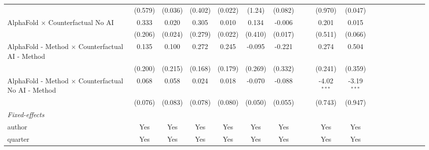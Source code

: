 \begin{tabular}{lcccccccccccccccccc}
                                                              & (0.579) & (0.036) & (0.402) & (0.022) & (1.24)        & (0.082)       &       &       & (0.970)       & (0.047)       &       &       &      &      &      &      &      &   \\   
   AlphaFold $\times$ Counterfactual No AI                    & 0.333   & 0.020   & 0.305   & 0.010   & 0.134         & -0.006        &       &       & 0.201         & 0.015         &       &       &      &      &      &      &      &   \\   
                                                              & (0.206) & (0.024) & (0.279) & (0.022) & (0.410)       & (0.017)       &       &       & (0.511)       & (0.066)       &       &       &      &      &      &      &      &   \\   
   AlphaFold - Method $\times$ Counterfactual AI - Method     & 0.135   & 0.100   & 0.272   & 0.245   & -0.095        & -0.221        &       &       & 0.274         & 0.504         &       &       &      &      &      &      &      &   \\   
                                                              & (0.200) & (0.215) & (0.168) & (0.179) & (0.269)       & (0.332)       &       &       & (0.241)       & (0.359)       &       &       &      &      &      &      &      &   \\   
   AlphaFold - Method $\times$ Counterfactual No AI - Method  & 0.068   & 0.058   & 0.024   & 0.018   & -0.070        & -0.088        &       &       & -4.02$^{***}$ & -3.19$^{***}$ &       &       &      &      &      &      &      &   \\   
                                                              & (0.076) & (0.083) & (0.078) & (0.080) & (0.050)       & (0.055)       &       &       & (0.743)       & (0.947)       &       &       &      &      &      &      &      &   \\   
   \midrule
   \emph{Fixed-effects}\\
   author                                                     & Yes     & Yes     & Yes     & Yes     & Yes           & Yes           &       &       & Yes           & Yes           &       &       &      &      &      &      &      & \\  
   quarter                                                    & Yes     & Yes     & Yes     & Yes     & Yes           & Yes           &       &       & Yes           & Yes           &       &       &      &      &      &      &      & \\  

\end{tabular}
